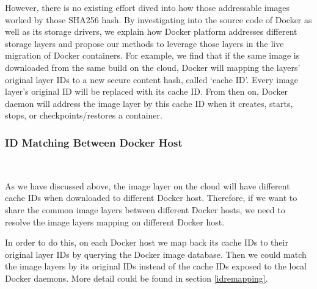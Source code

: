 However, there is no existing effort dived into how those addressable images worked by those SHA256 hash.
%
By investigating into the source code of Docker as well as its storage drivers, we explain how Docker platform addresses different storage layers and propose our methods to leverage those layers in the live migration of Docker containers.
%
For example, we find that 
if the same image is downloaded from the same build on the cloud, Docker will mapping the layers' original layer IDs to a new secure content hash, called `cache ID'. Every image layer's original ID will be replaced with its cache ID. From then on, Docker daemon will address the image layer by this cache ID when it creates, starts, stops, or checkpoints/restores a container. 

\smallbreak
\subsubsection{ID Matching Between Docker Host} \label{intro:idMatching}
~\smallbreak

As we have discussed above, 
the image layer on the cloud will have different cache IDs when downloaded to different Docker host. 
Therefore, if we want to share the common image layers between different Docker hosts, we need to resolve the image layers mapping on different Docker host. 

In order to do this, on each Docker host we map back its cache IDs to their original layer IDs by querying the Docker image database. 
Then we could match the image layers by its original IDs instead of the cache IDs exposed to the local Docker daemons. More detail could be found in section \ref{idremapping}.



